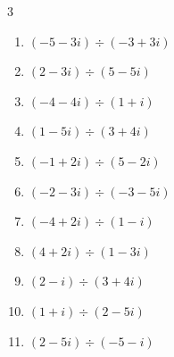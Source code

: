 \begin{multicols}{3}
\begin{enumerate}

  \item $\displaystyle (-5-3i)\div(-3+3i)$


  \item $\displaystyle (2-3i)\div(5-5i)$


  \item $\displaystyle (-4-4i)\div(1+i)$

        \phantom{$\displaystyle =-4$}

\columnbreak %

\resetques

  \item $\displaystyle (1-5i)\div(3+4i)$


  \item $\displaystyle (-1+2i)\div(5-2i)$


  \item $\displaystyle (-2-3i)\div(-3-5i)$


  \item $\displaystyle (-4+2i)\div(1-i)$

        \phantom{$\displaystyle =-3-i$}

  \item $\displaystyle (4+2i)\div(1-3i)$


  \item $\displaystyle (2-i)\div(3+4i)$


  \item $\displaystyle (1+i)\div(2-5i)$


  \item $\displaystyle (2-5i)\div(-5-i)$



\end{enumerate}
\end{multicols}
